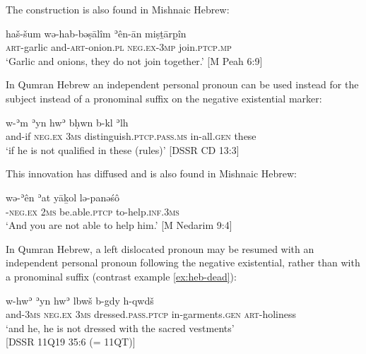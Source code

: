 ﻿\documentclass[output=paper]{langsci/langscibook}
\begin{document}
%
The construction is also found in Mishnaic Hebrew:
%
\begin{exe}\ex \label{ex:heb-garlic}
    \gll haš-šum wə-hab-bəṣālîm ʾên-ān    miṣṯārp̱în \\
  \textsc{art}-garlic   and-\textsc{art}-onion.\textsc{pl} \textsc{neg.ex-3mp}  
join.\textsc{ptcp.mp} \\
    \glt `Garlic and onions, they do not join together.'
    [M Peah 6:9]
    \end{exe}
%
In Qumran Hebrew an independent personal pronoun can be used instead for the subject instead of a pronominal suffix on the negative existential marker:
%
\begin{exe}\ex \label{ex:heb-qualified}
    \gll w-ʾm  ʾyn  hwʾ  bḥwn        b-kl ʾlh \\
    and-if    \textsc{neg.ex} \textsc{3ms} distinguish.\textsc{ptcp.pass.ms}
    in-all.\textsc{gen}  these\\
    \glt `if he is not qualified in these (rules)' [DSSR CD
13:3]
    \end{exe}
%
This innovation has diffused and is also found in Mishnaic Hebrew:
%
\begin{exe}\ex \label{ex:heb-unable-to-help}
    \gll {\ob}wə{\cb}-ʾên ʾat yāḵol lə-panəśô \\
[and]-\textsc{neg.ex} \textsc{2ms} be.able.\textsc{ptcp}
to-help.\textsc{inf.3ms} \\
    \glt `And you are not able to help him.' [M Nedarim
9:4]
    \end{exe}
%
In Qumran Hebrew, a left dislocated pronoun may be resumed with an
independent personal pronoun following the negative existential, rather
than with a pronominal suffix (contrast example
\ref{ex:heb-dead}):
%
\begin{exe}\ex \label{ex:heb-dressed}
    \gll w-hwʾ ʾyn hwʾ lbwš b-g{\ob}dy h-qwdš     
    \\ and-\textsc{3ms} \textsc{neg.ex} \textsc{3ms}
    dressed.\textsc{pass.ptcp}  in-garments.\textsc{gen}
    \textsc{art}-holiness\\
    \glt `and he, he is not dressed with the sacred vestments'\\
          [DSSR 11Q19 35:6 (= 11QT)]
    \end{exe}
\end{document}
